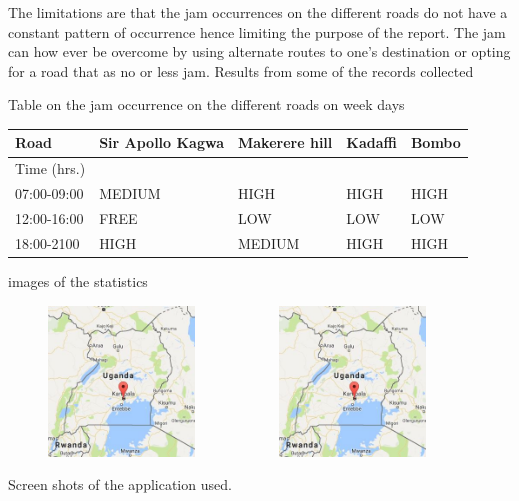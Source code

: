 \documentclass[options]{article}
\begin{document}
The limitations are that the jam occurrences on the different roads do not have a constant pattern of occurrence hence limiting the purpose of the report.
The jam can how ever be overcome by using alternate routes to one’s destination or opting for a road that as no or less jam.
Results from some of the records collected 


Table on the jam occurrence on the different roads on week days

\begin{tabular}{|l|l|l|l|l|}
\hline
Road& Sir Apollo Kagwa & Makerere hill & Kadaffi & Bombo \\
\hline
Time (hrs.) &  & & & \\
\hline
07:00-09:00& MEDIUM &HIGH&HIGH&HIGH \\
\hline
12:00-16:00 &FREE  & LOW&LOW & LOW\\
\hline
18:00-2100&HIGH  &MEDIUM & HIGH& HIGH\\
\hline

\end{tabular}
  
images of the statistics 

\includegraphics[width =6cm,height=4cm]{Captuhhre.JPG}
\includegraphics[width =6cm,height=4cm]{Captuhhre.JPG}

Screen shots of the application used.
\end{document}
